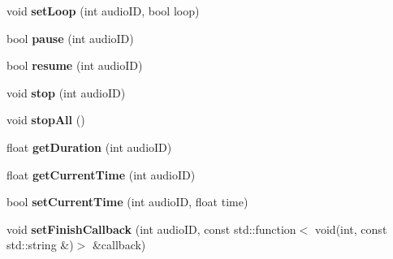 \begin{DoxyCompactItemize}
\item 
\mbox{\label{classexperimental_1_1AudioEngineImpl_afd6600a03fa747d44c79f09fbc41b373}} 
void {\bfseries set\+Loop} (int audio\+ID, bool loop)
\item 
\mbox{\label{classexperimental_1_1AudioEngineImpl_a4b7cd4c0f622f263dee4f8067cc364a1}} 
bool {\bfseries pause} (int audio\+ID)
\item 
\mbox{\label{classexperimental_1_1AudioEngineImpl_a300f339e4c5178c84522fe8654898e43}} 
bool {\bfseries resume} (int audio\+ID)
\item 
\mbox{\label{classexperimental_1_1AudioEngineImpl_a56856900e92d2a4c19ea1a629bf19393}} 
void {\bfseries stop} (int audio\+ID)
\item 
\mbox{\label{classexperimental_1_1AudioEngineImpl_abcf87e42d6015ae5a0760ce815fb6f28}} 
void {\bfseries stop\+All} ()
\item 
\mbox{\label{classexperimental_1_1AudioEngineImpl_a12fa2f700f4d6e4effc72e1ad7e030cb}} 
float {\bfseries get\+Duration} (int audio\+ID)
\item 
\mbox{\label{classexperimental_1_1AudioEngineImpl_a47be5365efeebd307e3891f3f71386f0}} 
float {\bfseries get\+Current\+Time} (int audio\+ID)
\item 
\mbox{\label{classexperimental_1_1AudioEngineImpl_a8abd3b8330fb7ca7f513016055333f9c}} 
bool {\bfseries set\+Current\+Time} (int audio\+ID, float time)
\item 
\mbox{\label{classexperimental_1_1AudioEngineImpl_ab4bc0ee1754fda9638d7d0c4470cf170}} 
void {\bfseries set\+Finish\+Callback} (int audio\+ID, const std\+::function$<$ void(int, const std\+::string \&)$>$ \&callback)
\item 
\mbox{\label{classexperimental_1_1AudioEngineImpl_a4ad8d3d499bf3e5fd262d710b215891e}} 

\end{DoxyCompactItemize}
